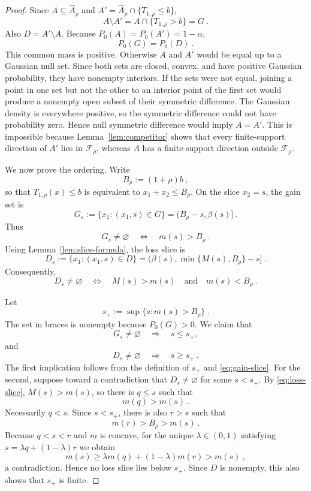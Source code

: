\documentclass[12pt]{article}
\theoremstyle{remark}
\begin{document}
\begin{proof}
Since $A\subseteq\widehat A_\rho$ and
$A'=\widehat A_\rho\cap\{T_{1,\rho}\le b\}$,
\[
A\setminus A'=A\cap\{T_{1,\rho}>b\}=G~.
\]
Also $D=A'\setminus A$.  Because $P_0(A)=P_0(A')=1-\alpha$,
\[
P_0(G)=P_0(D)~.
\]
This common mass is positive.  Otherwise $A$ and $A'$ would be equal up to a
Gaussian null set.  Since both sets are closed, convex, and have positive
Gaussian probability, they have nonempty interiors.  If the sets were not
equal, joining a point in one set but not the other to an interior point of the
first set would produce a nonempty open subset of their symmetric difference.
The Gaussian density is everywhere positive, so the symmetric difference could
not have probability zero.  Hence null symmetric difference would imply
$A=A'$.  This is impossible because Lemma~\ref{lem:competitor} shows that every
finite-support direction of $A'$ lies in $\mathcal F_\rho$, whereas $A$ has a
finite-support direction outside $\mathcal F_\rho$.

We now prove the ordering.  Write
\[
B_\rho:=(1+\rho)b~,
\]
so that $T_{1,\rho}(x)\le b$ is equivalent to
$x_1+x_2\le B_\rho$.  On the slice $x_2=s$, the gain set is
\[
G_s
:=\{x_1:(x_1,s)\in G\}
=
(B_\rho-s,\beta(s)]~.
\]
Thus
\begin{equation}\label{eq:gain-slice}
G_s\ne\varnothing
\quad\Longleftrightarrow\quad
m(s)>B_\rho~.
\end{equation}
Using Lemma~\ref{lem:slice-formula}, the loss slice is
\[
D_s
:=\{x_1:(x_1,s)\in D\}
=
(\beta(s),\min\{M(s),B_\rho\}-s]~.
\]
Consequently,
\begin{equation}\label{eq:loss-slice}
D_s\ne\varnothing
\quad\Longleftrightarrow\quad
M(s)>m(s)
\quad\text{and}\quad
m(s)<B_\rho~.
\end{equation}

Let
\[
s_+:=\sup\{s:m(s)>B_\rho\}~.
\]
The set in braces is nonempty because $P_0(G)>0$.  We claim that
\[
G_s\ne\varnothing\quad\Longrightarrow\quad s\le s_+,
\]
and
\[
D_s\ne\varnothing\quad\Longrightarrow\quad s\ge s_+~.
\]
The first implication follows from the definition of $s_+$ and
\eqref{eq:gain-slice}.  For the second, suppose toward a contradiction that
$D_s\ne\varnothing$ for some $s<s_+$.  By \eqref{eq:loss-slice},
$M(s)>m(s)$, so there is $q\le s$ such that
\[
m(q)>m(s)~.
\]
Necessarily $q<s$.  Since $s<s_+$, there is also $r>s$ such that
\[
m(r)>B_\rho>m(s)~.
\]
Because $q<s<r$ and $m$ is concave, for the unique $\lambda\in(0,1)$ satisfying
$s=\lambda q+(1-\lambda)r$ we obtain
\[
m(s)
\ge
\lambda m(q)+(1-\lambda)m(r)
>
m(s)~,
\]
a contradiction.  Hence no loss slice lies below $s_+$.  Since $D$ is nonempty,
this also shows that $s_+$ is finite.


\end{proof}
\end{document}
